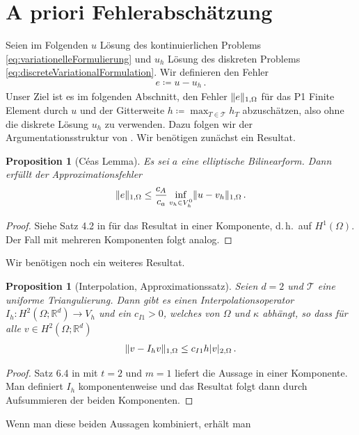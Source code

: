 \documentclass{scrartcl}
\newcounter{everything}
\newtheorem{proposition}[everything]{Proposition}
\def\R{\mathbb{R}}
\newcommand{\cT}{\mathcal{T}}
\DeclarePairedDelimiter{\abs}{\lvert}{\rvert}
\DeclarePairedDelimiter{\norm}{\lVert}{\rVert}
\begin{document}
\newpage 

\section{A priori Fehlerabschätzung}
Seien im Folgenden $u$ Lösung des kontinuierlichen Problems \eqref{eq:variationelleFormulierung} und $u_h$ Lösung des diskreten Problems \eqref{eq:discreteVariationalFormulation}.
Wir definieren den Fehler
\begin{align*}
	e\coloneqq u-u_h\,.
\end{align*}
Unser Ziel ist es im folgenden Abschnitt, den Fehler $\norm{e}_{1,\Omega}$ für das P1 Finite Element durch $u$ und der Gitterweite $h\coloneqq\max_{T\in\cT}h_T$ abzuschätzen, also ohne die diskrete Lösung $u_h$ zu verwenden.
Dazu folgen wir der Argumentationsstruktur von  \cite[Satz II.7.3]{Bra-2007}. Wir benötigen zunächst ein Resultat.
\begin{proposition}[Céas Lemma]
	Es sei $a$ eine elliptische Bilinearform. Dann erfüllt der Approximationsfehler
	\begin{align*}
		\norm{e}_{1,\Omega} \leq \frac{c_A}{c_a}\inf_{v_h\in V^0_h}\norm{u-v_h}_{1,\Omega}\,.
	\end{align*}
\end{proposition}
\begin{proof}
	Siehe Satz 4.2 in \cite[S.53]{Bra-2007} für das Resultat in einer Komponente, d.\,h.\ auf $H^1(\Omega)$. Der Fall mit mehreren Komponenten folgt analog.
\end{proof}
Wir benötigen noch ein weiteres Resultat.
\begin{proposition}[Interpolation, Approximationssatz]\label{pr:Approximationssatz}
	Seien $d=2$ und $\cT$ eine uniforme Triangulierung. Dann gibt es einen Interpolationsoperator $I_h\colon H^2(\Omega;\R^d)\to V_{h}$ und ein $c_{I1}>0$, welches von $\Omega$ und $\kappa$ abhängt, so dass für alle $v\in H^2(\Omega;\R^d)$
	\begin{align*}
		\norm{v-I_hv}_{1,\Omega}\leq c_{I1} h \abs{v}_{2,\Omega}\,.
	\end{align*}
\end{proposition}
\begin{proof}
	Satz 6.4 in \cite[S.75]{Bra-2007} mit $t=2$ und $m=1$ liefert die Aussage in einer Komponente. Man definiert $I_h$ komponentenweise und das Resultat folgt dann durch Aufsummieren der beiden Komponenten.
\end{proof}
Wenn man diese beiden Aussagen kombiniert, erhält man
\end{document}
